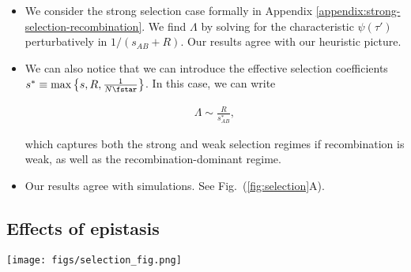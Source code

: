 \documentclass[aps,rmp,twocolumn,groupedaddress,floatfix,notitlepage]{revtex4-1}
\begin{document}
\begin{itemize}
\item We consider the strong selection case formally in Appendix \ref{appendix:strong-selection-recombination}. We find $\Lambda$ by solving for the characteristic $\psi(\tau')$ perturbatively in $1/(s_{AB} + R)$. Our results agree with our heuristic picture. 

\item We can also notice that we can introduce the effective selection coefficients $s^* \equiv \mathrm{max} \left\{ s, R, \frac{1}{N \fstar} \right\}$. In this case, we can write 

\begin{align}
    \Lambda \sim \frac{R}{s^*_{AB}},
\end{align}

which captures both the strong and weak selection regimes if recombination is weak, as well as the recombination-dominant regime. 


\item Our results agree with simulations. See Fig.~(\ref{fig:selection}A).

\end{itemize}


\newpage
\subsection*{Effects of epistasis}

\begin{figure*}[t]
\centering
\texttt{[image: figs/selection\_fig.png]}
\hfill
\caption{\textbf{Effects of selection.} \label{fig:selection} I did not have time to make better figures / run more simulations. I was thinking that for \textbf{A}, we should have $s/R$ on the x-axis, and show simulation results for both different $R$ and different $s$. For \textbf{B}, maybe we can only show results for one frequency -- where we can see all three regimes. Not sure if we should be calculating $\Lambda$ or the numerator w/ a different normalizing factor in simulations.}
\end{figure*}
\end{document}
